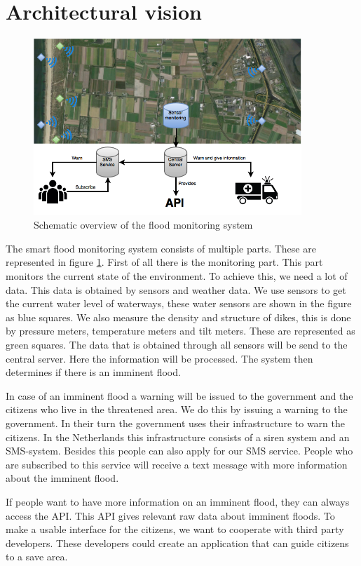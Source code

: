 \section{Architectural vision}
\begin{figure}[hb!]
\includegraphics[keepaspectratio=true,width=0.9\textwidth]{images/archVision.png}
\caption{Schematic overview of the flood monitoring system}
\label{fig:architectural-vision}
\end{figure}

The smart flood monitoring system consists of multiple parts. These are represented in figure \ref{fig:architectural-vision}. First of all there is the monitoring part. This part monitors the current state of the environment. To achieve this, we need a lot of data. This data is obtained by sensors and weather data. We use sensors to get the current water level of waterways, these water sensors are shown in the figure as blue squares. We also measure the density and structure of dikes, this is done by pressure meters, temperature meters and tilt meters. These are represented as green squares. The data that is obtained through all sensors will be send to the central server. Here the information will be processed. The system then determines if there is an imminent flood.

In case of an imminent flood a warning will be issued to the government and the citizens who live in the threatened area. We do this by issuing a warning to the government. In their turn the government uses their infrastructure to warn the citizens. In the Netherlands this infrastructure consists of a siren system and an SMS-system. Besides this people can also apply for our SMS service. People who are subscribed to this service will receive a text message with more information about the imminent flood. 

If people want to have more information on an imminent flood, they can always access the API. This API gives relevant raw data about imminent floods. To make a usable interface for the citizens, we want to cooperate with third party developers. These developers could create an application that can guide citizens to a save area.
